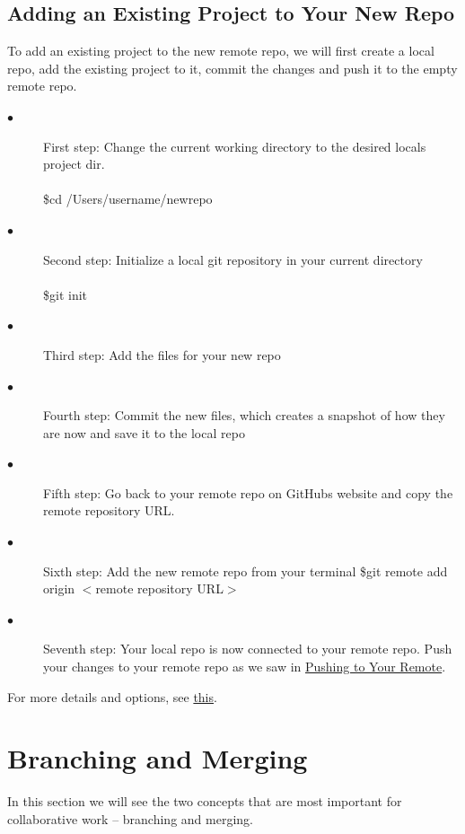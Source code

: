 \documentclass[12pt]{article}
\begin{document}
    \subsection{Adding an Existing Project to Your New Repo}
    To add an existing project to the new remote repo, we will first create a local repo, add the existing project to it, commit the changes and push it to the empty remote repo. 
    \begin{description}
    \item[$\bullet$] First step: Change the current working directory to the desired local\textquotesingle s project dir. \\
    \\
    \indent \$cd /Users/username/newrepo \\
    \item[$\bullet$] Second step: Initialize a local git repository in your current directory \\  
    \\
    \indent \$git init \\
    \item[$\bullet$] Third step: Add the files for your new repo 
    \item[$\bullet$] Fourth step: Commit the new files, which creates a snapshot of how they are now and save it to the local repo
    \item[$\bullet$] Fifth step: Go back to your remote repo on GitHub\textquotesingle s website and copy the remote repository URL.
    \item[$\bullet$] Sixth step: Add the new remote repo from your terminal
    \indent \$git remote add origin $<$remote repository URL$>$
    \item[$\bullet$] Seventh step: Your local repo is now connected to your remote repo. Push your changes to your remote repo as we saw in \hyperref[sec:pushing]{Pushing to Your Remote}.
    \end{description}
    For more details and options, see \href{https://help.github.com/articles/adding-an-existing-project-to-github-using-the-command-line/}{this}.
    \section{Branching and Merging}
    In this section we will see the two concepts that are most important for collaborative work -- branching and merging.
\end{document}
